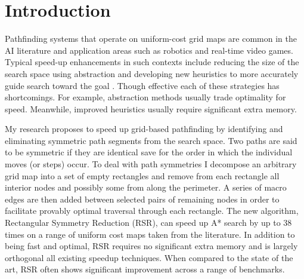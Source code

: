 \section{Introduction}
\label{sec:introduction}
Pathfinding systems that operate on uniform-cost grid maps are common in the AI
literature and application areas such as robotics and real-time
video games.  Typical speed-up enhancements in such contexts include reducing
the size of the search space using abstraction \cite{botea04} and developing new
heuristics to more accurately guide search toward the goal \cite{sturtevant09}.
Though effective each of these strategies has shortcomings.  For example,
abstraction methods usually trade optimality for speed.  Meanwhile, improved
heuristics usually require significant extra memory.
\par 
My research proposes to speed up grid-based pathfinding by identifying
and eliminating symmetric path segments from the search space. 
Two paths are said to be symmetric if they are identical save for the order
in which the individual moves (or steps) occur. 
To deal with path symmetries I decompose an arbitrary
grid map into a set of empty rectangles and remove from each rectangle all
interior nodes and possibly some from along the perimeter.  A series of macro
edges are then added between selected pairs of remaining nodes in order to
facilitate provably optimal traversal through each rectangle.  The new
algorithm, Rectangular Symmetry Reduction (RSR), can speed up A* search by up to
38 times on a range of uniform cost maps taken from the literature.  In addition
to being fast and optimal, RSR requires no significant extra memory and is
largely orthogonal all existing speedup techniques.  When compared to the state
of the art, RSR often shows significant improvement across a range of
benchmarks.
